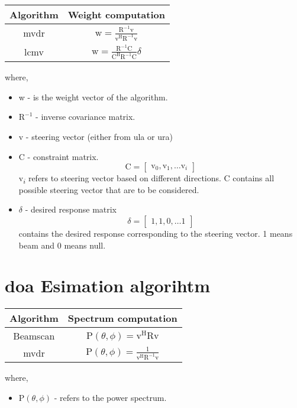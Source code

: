 \begin{center}
	\renewcommand{\arraystretch}{1.5}
	\begin{tabular}{|c|c|}
		\hline
		Algorithm & Weight computation  \\ \hline
		\acl{mvdr}   & $\text{w} = \frac{\text{R}^{-1} \text{v}}{\text{v}^{\text{H}} \text{R}^{-1} \text{v}}$          \\ \hline
		\acl{lcmv}   & $\text{w} = \frac{\text{R}^{-1} \text{C}}{\text{C}^{\text{H}} \text{R}^{-1} \text{C}} \delta$                 \\ \hline
	\end{tabular}
\end{center}

where, 

\begin{itemize}
	\item w - is the weight vector of the algorithm.
	\item $\text{R}^{-1}$ - inverse covariance matrix.
	\item v - steering vector (either from \ac{ula} or \ac{ura})
	\item C - constraint matrix.
	$$ \text{C} = \begin{bmatrix}
		\text{v}_0, \text{v}_1, \hdots \text{v}_i
	\end{bmatrix}$$ 
	v\textsubscript{$i$} refers to steering vector based on different directions. C contains all possible steering vector that are to be considered.
	\item $\delta$ - desired response matrix
	$$ \delta = \begin{bmatrix}
		1, 1, 0, \hdots 1
	\end{bmatrix} $$
	contains the desired response corresponding to the steering vector. 1 means beam and 0 means null.
\end{itemize}

\section{\ac{doa} Esimation algorihtm}

\begin{center}
	\renewcommand{\arraystretch}{1.5}
	\begin{tabular}{|c|c|}
		\hline
		Algorithm & Spectrum computation  \\ \hline
		Beamscan   & $\text{P}(\theta, \phi) = \text{v}^\text{H} \text{R} \text{v}$          \\ \hline
		\acl{mvdr}   & $\text{P}(\theta, \phi) = \frac{1}{\text{v}^{\text{H}} \text{R}^{-1} \text{v}} $              \\ \hline
	\end{tabular}
\end{center}

where,

\begin{itemize}
	\item $\text{P}(\theta, \phi)$ - refers to the power spectrum.
	 
\end{itemize}
